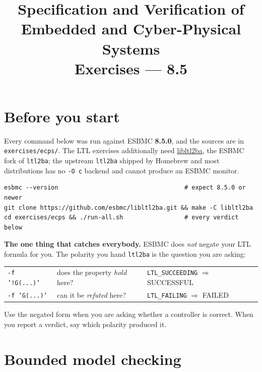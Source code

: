 \documentclass[11pt,a4paper]{article}
\title{\vspace{-1.5cm}Specification and Verification of\\Embedded and Cyber-Physical Systems\\[4pt]
       \large Exercises --- \esbmc{} 8.5}
\author{}
\date{}
\newcommand{\esbmc}{ESBMC}
\newcommand{\flag}[1]{\texttt{\small #1}}
\newcommand{\file}[1]{\texttt{\small #1}}
\begin{document}
\maketitle
\vspace{-1.6cm}

\section*{Before you start}

Every command below was run against \esbmc{} \textbf{8.5.0}, and the sources are
in \file{exercises/ecps/}. The LTL exercises additionally need
\href{https://github.com/esbmc/libltl2ba}{libltl2ba}, the ESBMC fork of
\texttt{ltl2ba}; the upstream \texttt{ltl2ba} shipped by Homebrew and most
distributions has no \flag{-O c} backend and cannot produce an \esbmc{} monitor.

\begin{lstlisting}[style=sh]
esbmc --version                                   # expect 8.5.0 or newer
git clone https://github.com/esbmc/libltl2ba.git && make -C libltl2ba
cd exercises/ecps && ./run-all.sh                 # every verdict below
\end{lstlisting}

\noindent
\textbf{The one thing that catches everybody.} \esbmc{} does \emph{not} negate
your LTL formula for you. The polarity you hand \texttt{ltl2ba} is the question
you are asking:

\smallskip
\begin{center}
\begin{tabular}{@{}lll@{}}
\texttt{\small -f '!G(...)'} & does the property \emph{hold} here?
  & \texttt{\small LTL\_SUCCEEDING} $\Rightarrow$ SUCCESSFUL \\
\texttt{\small -f 'G(...)'}  & can it be \emph{refuted} here?
  & \texttt{\small LTL\_FAILING} $\Rightarrow$ FAILED \\
\end{tabular}
\end{center}
\smallskip

\noindent
Use the negated form when you are asking whether a controller is correct. When
you report a verdict, say which polarity produced it.

\section{Bounded model checking}
\end{document}
